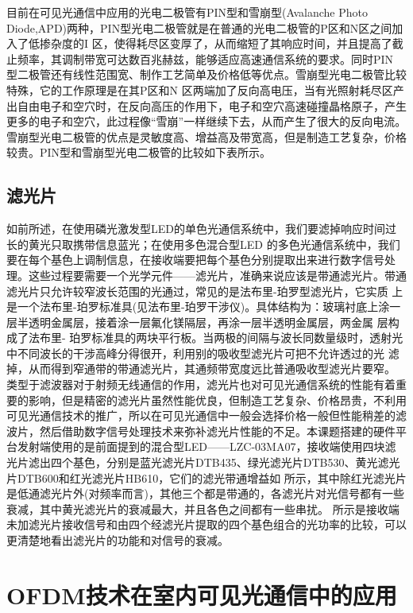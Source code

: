 目前在可见光通信中应用的光电二极管有PIN型和雪崩型(Avalanche Photo Diode,APD)两种，PIN型光电二极管就是在普通的光电二极管的P区和N区之间加入了低掺杂度的I 区，使得耗尽区变厚了，从而缩短了其响应时间，并且提高了截止频率，其调制带宽可达数百兆赫兹，能够适应高速通信系统的要求。同时PIN 型二极管还有线性范围宽、制作工艺简单及价格低等优点。雪崩型光电二极管比较特殊，它的工作原理是在其P区和N 区两端加了反向高电压，当有光照射耗尽区产出自由电子和空穴时，在反向高压的作用下，电子和空穴高速碰撞晶格原子，产生更多的电子和空穴，此过程像“雪崩”一样继续下去，从而产生了很大的反向电流。雪崩型光电二极管的优点是灵敏度高、增益高及带宽高，但是制造工艺复杂，价格较贵。PIN型和雪崩型光电二极管的比较如下表所示。


\subsection{滤光片}
如前所述，在使用磷光激发型LED的单色光通信系统中，我们要滤掉响应时间过长的黄光只取携带信息蓝光；在使用多色混合型LED 的多色光通信系统中，我们要在每个基色上调制信息，在接收端要把每个基色分别提取出来进行数字信号处理。这些过程要需要一个光学元件——滤光片，准确来说应该是带通滤光片。带通滤光片只允许较窄波长范围的光通过，常见的是法布里-珀罗型滤光片，它实质 上是一个法布里-珀罗标准具(见法布里-珀罗干涉仪)。具体结构为：玻璃衬底上涂一层半透明金属层，接着涂一层氟化镁隔层，再涂一层半透明金属层，两金属 层构成了法布里- 珀罗标准具的两块平行板。当两极的间隔与波长同数量级时，透射光中不同波长的干涉高峰分得很开，利用别的吸收型滤光片可把不允许透过的光 滤掉，从而得到窄通带的带通滤光片，其通频带宽度远比普通吸收型滤光片要窄\cite{OpticalFilter}。
类型于滤波器对于射频无线通信的作用，滤光片也对可见光通信系统的性能有着重要的影响，但是精密的滤光片虽然性能优良，但制造工艺复杂、价格昂贵，不利用可见光通信技术的推广，所以在可见光通信中一般会选择价格一般但性能稍差的滤波片，然后借助数字信号处理技术来弥补滤光片性能的不足。本课题搭建的硬件平台发射端使用的是前面提到的混合型LED——LZC-03MA07，接收端使用四块滤光片滤出四个基色，分别是蓝光滤光片DTB435、绿光滤光片DTB530、黄光滤光片DTB600和红光滤光片HB610，它们的滤光带通增益如
所示，其中除红光滤光片是低通滤光片外(对频率而言)，其他三个都是带通的，各滤光片对光信号都有一些衰减，其中黄光滤光片的衰减最大，并且各色之间都有一些串扰。
所示是接收端未加滤光片接收信号和由四个经滤光片提取的四个基色组合的光功率的比较，可以更清楚地看出滤光片的功能和对信号的衰减。
\section{OFDM技术在室内可见光通信中的应用}
